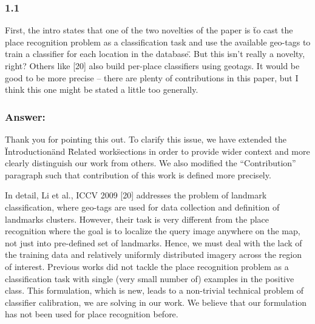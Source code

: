 \documentclass[a4paper,12pt]{article}
\begin{document}
\subsubsection*{1.1}
First, the intro states that one of the two novelties of the paper is \"to cast the place recognition problem as a classification task and use the available geo-tags to train a classifier for each location in the database\". But this isn't really a novelty, right? Others like [20] also build per-place classifiers using geotags. It would be good to be more precise -- there are plenty of contributions in this paper, but I think this one might be stated a little too generally.

{\color{blue}
\subsubsection*{Answer:}
Thank you for pointing this out. To clarify this issue, we have extended the \"Introduction\" and \"Related work\" sections in order to provide wider context and more clearly distinguish our work from others. We also modified the “Contribution” paragraph such that contribution of this work is defined more precisely.

In detail, Li et al., ICCV 2009 [20] addresses the problem of landmark classification, where geo-tags are used for data collection and definition of landmarks clusters. However, their task is very different from the place recognition where the goal is to localize the query image anywhere on the map, not just into pre-defined set of landmarks. Hence, we must deal with the lack of the training data and relatively uniformly distributed imagery across the region of interest. Previous works did not tackle the place recognition problem as a classification task with single (very small number of) examples in the positive class. This formulation, which is new, leads to a non-trivial technical problem of classifier calibration, we are solving in our work. We believe that our formulation has not been used for place recognition before.
}
\end{document}
